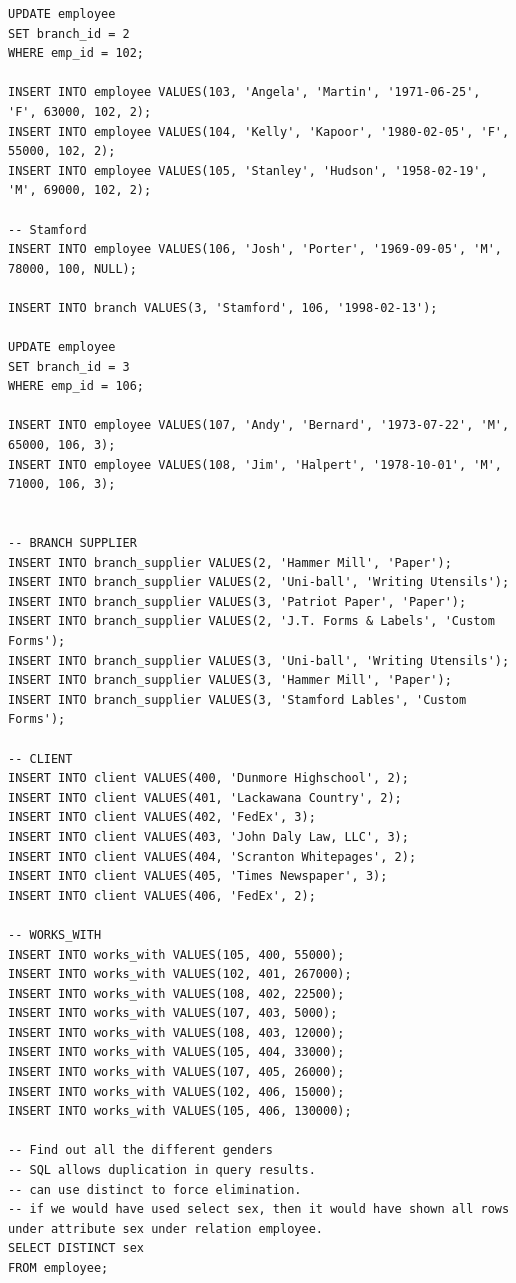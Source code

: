 \documentclass[8pt, a4paper, oneside, twocolumn]{extarticle}
\begin{document}
\begin{verbatim}
UPDATE employee
SET branch_id = 2
WHERE emp_id = 102;

INSERT INTO employee VALUES(103, 'Angela', 'Martin', '1971-06-25', 'F', 63000, 102, 2);
INSERT INTO employee VALUES(104, 'Kelly', 'Kapoor', '1980-02-05', 'F', 55000, 102, 2);
INSERT INTO employee VALUES(105, 'Stanley', 'Hudson', '1958-02-19', 'M', 69000, 102, 2);

-- Stamford
INSERT INTO employee VALUES(106, 'Josh', 'Porter', '1969-09-05', 'M', 78000, 100, NULL);

INSERT INTO branch VALUES(3, 'Stamford', 106, '1998-02-13');

UPDATE employee
SET branch_id = 3
WHERE emp_id = 106;

INSERT INTO employee VALUES(107, 'Andy', 'Bernard', '1973-07-22', 'M', 65000, 106, 3);
INSERT INTO employee VALUES(108, 'Jim', 'Halpert', '1978-10-01', 'M', 71000, 106, 3);


-- BRANCH SUPPLIER
INSERT INTO branch_supplier VALUES(2, 'Hammer Mill', 'Paper');
INSERT INTO branch_supplier VALUES(2, 'Uni-ball', 'Writing Utensils');
INSERT INTO branch_supplier VALUES(3, 'Patriot Paper', 'Paper');
INSERT INTO branch_supplier VALUES(2, 'J.T. Forms & Labels', 'Custom Forms');
INSERT INTO branch_supplier VALUES(3, 'Uni-ball', 'Writing Utensils');
INSERT INTO branch_supplier VALUES(3, 'Hammer Mill', 'Paper');
INSERT INTO branch_supplier VALUES(3, 'Stamford Lables', 'Custom Forms');

-- CLIENT
INSERT INTO client VALUES(400, 'Dunmore Highschool', 2);
INSERT INTO client VALUES(401, 'Lackawana Country', 2);
INSERT INTO client VALUES(402, 'FedEx', 3);
INSERT INTO client VALUES(403, 'John Daly Law, LLC', 3);
INSERT INTO client VALUES(404, 'Scranton Whitepages', 2);
INSERT INTO client VALUES(405, 'Times Newspaper', 3);
INSERT INTO client VALUES(406, 'FedEx', 2);

-- WORKS_WITH
INSERT INTO works_with VALUES(105, 400, 55000);
INSERT INTO works_with VALUES(102, 401, 267000);
INSERT INTO works_with VALUES(108, 402, 22500);
INSERT INTO works_with VALUES(107, 403, 5000);
INSERT INTO works_with VALUES(108, 403, 12000);
INSERT INTO works_with VALUES(105, 404, 33000);
INSERT INTO works_with VALUES(107, 405, 26000);
INSERT INTO works_with VALUES(102, 406, 15000);
INSERT INTO works_with VALUES(105, 406, 130000);

-- Find out all the different genders
-- SQL allows duplication in query results.
-- can use distinct to force elimination.
-- if we would have used select sex, then it would have shown all rows under attribute sex under relation employee.
SELECT DISTINCT sex
FROM employee;


\end{verbatim}
\end{document}
